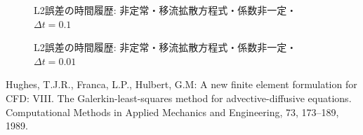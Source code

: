 \documentclass[8pt,a4paper]{article}
\begin{document}
\begin{figure}[h!!]
	\caption{L2誤差の時間履歴: 非定常・移流拡散方程式・係数非一定・$\Delta t = 0.1$}
	\label{fig:l2th_convdiff_nonsteady_dt01}
\end{figure}
\begin{figure}[h!!]
	\caption{L2誤差の時間履歴: 非定常・移流拡散方程式・係数非一定・$\Delta t = 0.01$}
	\label{fig:l2th_convdiff_nonsteady_dt01}
\end{figure}

\begin{thebibliography}{99}
	 Hughes, T.J.R., Franca, L.P., Hulbert, G.M: A new finite element formulation for CFD: VIII. The Galerkin-least-squares method for advective-diffusive equations. Computational Methods in Applied Mechanics and Engineering, 73, 173--189, 1989.
\end{thebibliography}
\end{document}

